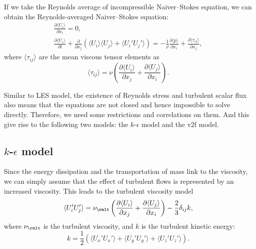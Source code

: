 \documentclass[english, nochinese]{pkupaper}
\begin{document}
If we take the Reynolds average of incompressible Naiver--Stokes equation, we can obtain the Reynolds-averaged Naiver--Stokes equation:
\begin{gather}
\frac{\partial\langle U_i\rangle}{\partial x_i} = 0, \\
\frac{\partial\langle U_i\rangle}{\partial t} + \frac{\partial}{\partial x_j}\left(\langle U_i\rangle\langle U_j\rangle + \langle U_i'U_j'\rangle\right) = - \frac{1}{\rho} \frac{\partial\langle p\rangle}{\partial x_i} + \frac{\partial\langle\tau_{ij}\rangle}{\partial x_j},
\end{gather}
where $\langle\tau_{ij}\rangle$ are the mean viscous tensor elements as
\begin{equation}
\langle\tau_{ij}\rangle = \nu\left(\frac{\partial\langle U_i\rangle}{\partial x_j} + \frac{\partial\langle U_j\rangle}{\partial x_i}\right).
\end{equation}

Similar to LES model, the existence of Reynolds stress and turbulent scalar flux also means that the equations are not closed and hence impossible to solve directly. Therefore, we need some restrictions and correlations on them. And this give rise to the following two models: the $k$-$\epsilon$ model and the v2f model.

\subsection{$k$-$\epsilon$ model}

Since the energy dissipation and the transportation of mass link to the viscosity, we can simply assume that the effect of turbulent flows is represented by an increased viscosity. This leads to the turbulent viscosity model
\begin{equation}
\langle U_i'U_j'\rangle = \nu_{\rmlt}\left(\frac{\partial\langle U_i\rangle}{\partial x_j} + \frac{\partial\langle U_j\rangle}{\partial x_i}\right) - \frac{2}{3}\delta_{ij}k,
\end{equation}
where $\nu_{\rmlt}$ is the turbulent viscosity, and $k$ is the turbulent kinetic energy:
\begin{equation}
k = \frac{1}{2}(\langle U_x'U_x'\rangle + \langle U_y'U_y'\rangle + \langle U_z'U_z'\rangle).
\end{equation}
\end{document}

